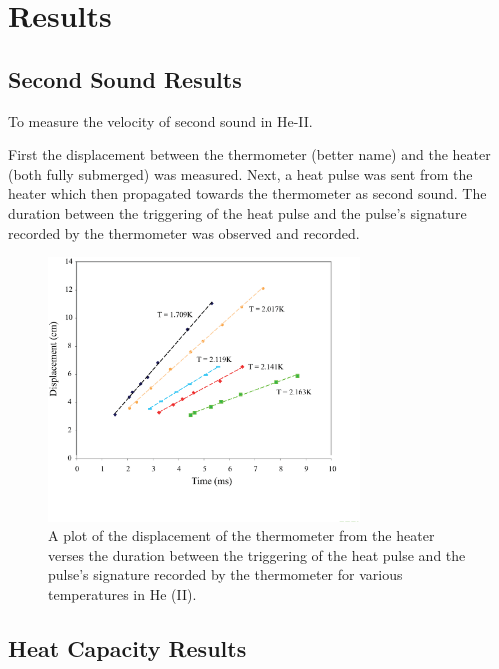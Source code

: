 
\section{Results}\label{results}

\subsection{Second Sound Results}\label{secondsoundresults}

To measure the velocity of second sound in He-II.  

First the displacement between the thermometer (better name) and the heater (both fully submerged) was measured. Next, a heat pulse was sent from the heater which then propagated towards the thermometer as second sound.  The duration between the triggering of the heat pulse and the pulse's signature recorded by the thermometer was observed and recorded.

\begin{figure}[htbp]
\begin{center}
\includegraphics[height=70mm]{./figures/secondsoundraw.eps}
\caption{\small{A plot of the displacement of the thermometer from the heater verses the duration between the triggering of the heat pulse and the pulse's signature recorded by the thermometer for various temperatures in He (II).}}
\label{fig:secondsoundraw}
\end{center}
\end{figure}

\subsection{Heat Capacity Results}\label{heatcapacityresults}

